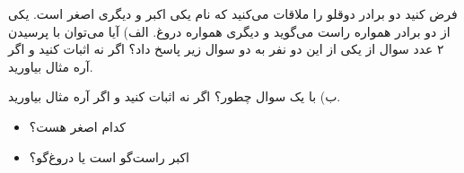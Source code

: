 \p
      فرض کنید دو برادر دوقلو را ملاقات می‌کنید که نام یکی اکبر و دیگری اصغر است. یکی از دو برادر همواره راست می‌گوید و دیگری همواره دروغ.
 الف) آیا می‌توان با پرسیدن ۲ عدد سوال از یکی از این دو نفر به دو سوال زیر پاسخ داد؟
 اگر نه اثبات کنید و اگر آره مثال بیاورید.
 
 
 ب) با یک سوال چطور؟
اگر نه اثبات کنید و اگر آره مثال بیاورید.


 \begin{itemize}
\item
 کدام اصغر هست؟
 
 \item
  اکبر راست‌گو است یا دروغ‌گو؟
  \end{itemize}